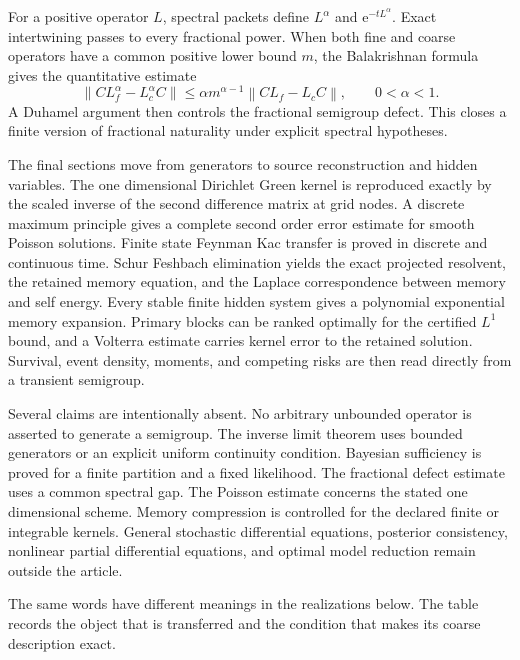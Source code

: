 \documentclass{aomart}
\theoremstyle{definition}
\theoremstyle{remark}
\newcommand{\e}{\mathrm e}
\newcommand{\norm}[1]{\left\lVert#1\right\rVert}
\begin{document}
For a positive operator \(L\), spectral packets define \(L^\alpha\) and \(\e^{-tL^\alpha}\). Exact intertwining passes to every fractional power. When both fine and coarse operators have a common positive lower bound \(m\), the Balakrishnan formula gives the quantitative estimate
\[
\norm{CL_f^\alpha-L_c^\alpha C}
\leq
\alpha m^{\alpha-1}
\norm{CL_f-L_cC},
\qquad 0<\alpha<1.
\]
A Duhamel argument then controls the fractional semigroup defect. This closes a finite version of fractional naturality under explicit spectral hypotheses.

The final sections move from generators to source reconstruction and hidden variables. The one dimensional Dirichlet Green kernel is reproduced exactly by the scaled inverse of the second difference matrix at grid nodes. A discrete maximum principle gives a complete second order error estimate for smooth Poisson solutions. Finite state Feynman Kac transfer is proved in discrete and continuous time. Schur Feshbach elimination yields the exact projected resolvent, the retained memory equation, and the Laplace correspondence between memory and self energy. Every stable finite hidden system gives a polynomial exponential memory expansion. Primary blocks can be ranked optimally for the certified \(L^1\) bound, and a Volterra estimate carries kernel error to the retained solution. Survival, event density, moments, and competing risks are then read directly from a transient semigroup.

Several claims are intentionally absent. No arbitrary unbounded operator is asserted to generate a semigroup. The inverse limit theorem uses bounded generators or an explicit uniform continuity condition. Bayesian sufficiency is proved for a finite partition and a fixed likelihood. The fractional defect estimate uses a common spectral gap. The Poisson estimate concerns the stated one dimensional scheme. Memory compression is controlled for the declared finite or integrable kernels. General stochastic differential equations, posterior consistency, nonlinear partial differential equations, and optimal model reduction remain outside the article.

The same words have different meanings in the realizations below. The table records the object that is transferred and the condition that makes its coarse description exact.
\end{document}
